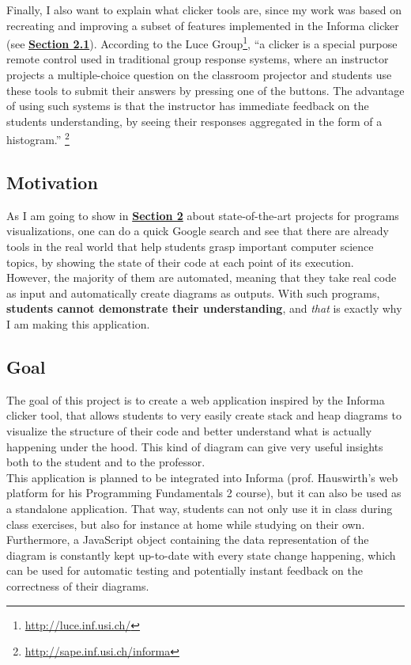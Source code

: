 \documentclass[]{usiinfbachelorproject}
\begin{document}
\vspace{\fill}
\pagebreak
 
\noindent Finally, I also want to explain what clicker tools are, since my work was based on recreating and improving a subset of features implemented in the Informa clicker (see \hyperref[informa clicker]{\textbf{Section 2.1}}). According to the Luce Group\footnote{\url{http://luce.inf.usi.ch/}}, ``a clicker is a special purpose remote control used in traditional group response systems, where an instructor projects a multiple-choice question on the classroom projector and students use these tools to submit their answers by pressing one of the buttons. The advantage of using such systems is that the instructor has immediate feedback on the students understanding, by seeing their responses aggregated in the form of a histogram.'' \footnote{\url{http://sape.inf.usi.ch/informa}}
 
\subsection{Motivation}

As I am going to show in \hyperref[state]{\textbf{Section 2}} about state-of-the-art projects for programs visualizations, one can do a quick Google search and see that there are already tools in the real world that help students grasp important computer science topics, by showing the state of their code at each point of its execution.\\
However, the majority of them are automated, meaning that they take real code as input and automatically create diagrams as outputs. With such programs, \textbf{students cannot demonstrate their understanding}, and \emph{that} is exactly why I am making this application.

\subsection{Goal} \label{goal}

The goal of this project is to create a web application inspired by the Informa clicker tool, that allows students to very easily create stack and heap diagrams to visualize the structure of their code and better understand what is actually happening under the hood. This kind of diagram can give very useful insights both to the student and to the professor.\\ This application is planned to be integrated into Informa (prof. Hauswirth's web platform for his Programming Fundamentals 2 course), but it can also be used as a standalone application. That way, students can not only use it in class during class exercises, but also for instance at home while studying on their own.\\
Furthermore, a JavaScript object containing the data representation of the diagram is constantly kept up-to-date with every state change happening, which can be used for automatic testing and potentially instant feedback on the correctness of their diagrams.
\end{document}

